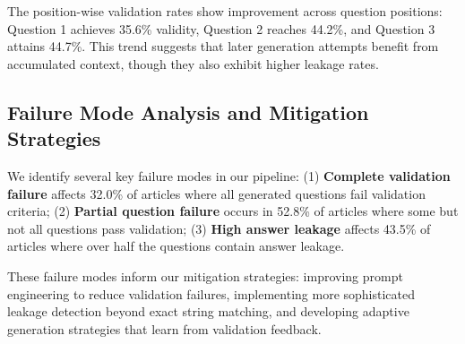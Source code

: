 The position-wise validation rates show improvement across question positions: Question 1 achieves 35.6\% validity, Question 2 reaches 44.2\%, and Question 3 attains 44.7\%. This trend suggests that later generation attempts benefit from accumulated context, though they also exhibit higher leakage rates.

\subsection{Failure Mode Analysis and Mitigation Strategies}
\label{subsec:failure_analysis}

We identify several key failure modes in our pipeline: (1) \textbf{Complete validation failure} affects 32.0\% of articles where all generated questions fail validation criteria; (2) \textbf{Partial question failure} occurs in 52.8\% of articles where some but not all questions pass validation; (3) \textbf{High answer leakage} affects 43.5\% of articles where over half the questions contain answer leakage.

These failure modes inform our mitigation strategies: improving prompt engineering to reduce validation failures, implementing more sophisticated leakage detection beyond exact string matching, and developing adaptive generation strategies that learn from validation feedback.

